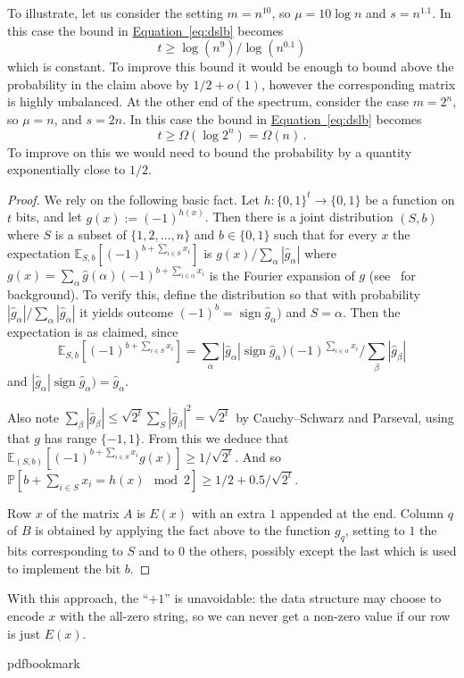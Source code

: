 \documentclass[11pt]{article}
\newcommand{\expeqref}[2]{\texorpdfstring{\hyperref[#2]{#1~\eqref{#2}}}{#1~\eqref{#2}}}
\DeclareMathOperator{\sign}{\mathrm{sign}}  %
\newcommand{\zo}{\{0, 1\}}
\renewcommand{\P}{\mathbb{P}}
\newcommand{\E}{\mathbb{E}}
\renewcommand{\a}{\alpha}
\renewcommand{\b}{\beta}
\begin{document}
To illustrate, let us consider the setting $m=n^{10}$, so $\mu=10\log n$
and $s=n^{1.1}$. In this case the bound in \expeqref{Equation}{eq:dslb}
becomes
\[
t\ge\log(n^{9})/\log(n^{0.1})
\]
which is constant. To improve this bound it would be enough to bound
above the probability in the claim above by $1/2+o(1)$, however the
corresponding matrix is highly unbalanced. At the other end of the
spectrum, consider the case $m=2^{n}$, so $\mu=n$, and $s=2n$.
In this case the bound in \expeqref{Equation}{eq:dslb} becomes
\[
t\ge\Omega(\log2^{n})=\Omega(n)\,.
\]
To improve on this we would need to bound the probability by a quantity
exponentially close to $1/2$.
\begin{proof}
We rely on the following basic fact. Let $h:\zo^{t}\to\{0,1\}$ be
a function on $t$ bits, and let $g(x):=(-1)^{h(x)}$. Then there
is a joint distribution $(S,b)$ where $S$ is a subset of $\{1,2,\ldots,n\}$
and $b\in\{0,1\}$ such that for every $x$ the expectation $\E_{S,b}[(-1)^{b+\sum_{i\in S}x_{i}}]$
is $g(x)/\sum_{\a}|\hat{g}_{\a}|$ where $g(x)=\sum_{\alpha}\hat{g}(\alpha)(-1)^{b+\sum_{i\in\a}x_{i}}$
is the Fourier expansion of $g$ (see~\cite{ODonnell14} for background).
To verify this, define the distribution so that with probability $|\hat{g}_{\a}|/\sum_{\a}|\hat{g}_{\a}|$
it yields outcome $(-1)^{b}=\sign\hat{g}_{\a})$ and $S=\a$. Then
the expectation is as claimed, since
\[
\E_{S,b}[(-1)^{b+\sum_{i\in S}x_{i}}]=
%
%
\sum_{\a}|\hat{g}_{\a}|\sign\hat{g}_{\a})(-1)^{\sum_{i\in\a}x_{i}}\Big/\sum_{\b}|\hat{g}_{\b}| %
\]
and $|\hat{g}_{\a}|\sign\hat{g}_{\a})=\hat{g}_{\a}$.

Also note $\sum_{\b}|\hat{g}_{\b}|\le\sqrt{2^{t}}\sum_{S}|\hat{g}_{\b}|^{2}=\sqrt{2^{t}}$
by Cauchy--Schwarz and Parseval, using that $g$ has range $\{-1,1\}$.
From this we deduce that $\E_{(S,b)}[(-1)^{b+\sum_{i\in S}x_{i}}g(x)]\ge1/\sqrt{2^{t}}$.
And so $\P[b+\sum_{i\in S}x_{i}=h(x)\mod2]\ge1/2+0.5/\sqrt{2^{t}}$.

Row $x$ of the matrix $A$ is $E(x)$ with an extra $1$ appended
at the end. Column $q$ of $B$ is obtained by applying the fact above
to the function $g_{q}$, setting to $1$ the bits corresponding to
$S$ and to $0$ the others, possibly except the last which is used
to implement the bit $b$.
\end{proof}
With this approach, the ``$+1$'' is unavoidable: the data structure
may choose to encode $x$ with the all-zero string, so we can never
get a non-zero value if our row is just $E(x)$.

\newcommand{\prelim}{Preliminary version in\ }\newcommand{\prelims}{Preliminary
  versions in\ }
\providecommand{\bibhead}[1]{}
\expandafter\ifx\csname pdfbookmark\endcsname\relax%
  \providecommand{\tocrefpdfbookmark}{}
\else\providecommand{\tocrefpdfbookmark}{%
   \hypertarget{tocreferences}{}%
   \pdfbookmark[1]{References}{tocreferences}}%
\fi
\end{document}
